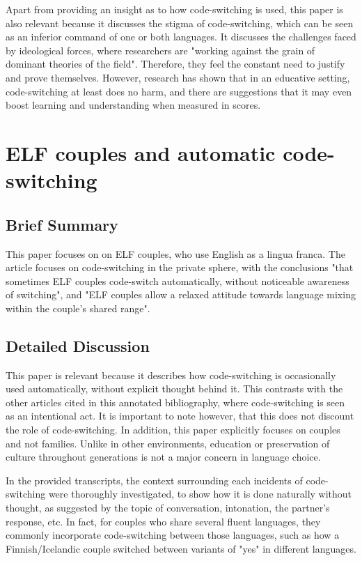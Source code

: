 \documentclass[12pt]{article}
\begin{document}
Apart from providing an insight as to how code-switching is used, this paper is also relevant because it discusses the stigma of code-switching, which can be seen as an inferior command of one or both languages. It discusses the challenges faced by ideological forces, where researchers are "working against the grain of dominant theories of the field". Therefore, they feel the constant need to justify and prove themselves. However, research has shown that in an educative setting, code-switching at least does no harm, and there are suggestions that it may even boost learning and understanding when measured in scores.

\section{ELF couples and automatic code-switching~\cite{couples}}

\subsection{Brief Summary}

This paper focuses on on ELF couples, who use English as a lingua franca. The article focuses on code-switching in the private sphere, with the conclusions "that sometimes ELF couples code-switch automatically, without noticeable awareness of switching", and "ELF couples allow a relaxed attitude towards language mixing within the couple’s shared range".

\subsection{Detailed Discussion}

This paper is relevant because it describes how code-switching is occasionally used automatically, without explicit thought behind it. This contrasts with the other articles cited in this annotated bibliography, where code-switching is seen as an intentional act. It is important to note however, that this does not discount the role of code-switching. In addition, this paper explicitly focuses on couples and not families. Unlike in other environments, education or preservation of culture throughout generations is not a major concern in language choice.

In the provided transcripts, the context surrounding each incidents of code-switching were thoroughly investigated, to show how it is done naturally without thought, as suggested by the topic of conversation, intonation, the partner's response, etc. In fact, for couples who share several fluent languages, they commonly incorporate code-switching between those languages, such as how a Finnish/Icelandic couple switched between variants of "yes" in different languages.
\end{document}
